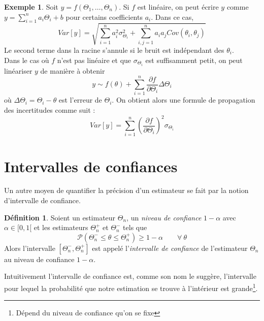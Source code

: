 \documentclass[a4paper,12pt]{report}
\theoremstyle{definition}
\renewcommand{\(}{\left(}
\renewcommand{\)}{\right)}
\renewcommand{\P}{\mathcal{P}}
\renewcommand{\d}{\textit}
\newtheorem{defn}[thm]{Définition}
\newtheorem{exmp}[thm]{Exemple}
\begin{document}
        \begin{exmp}
            Soit $y=f(\Theta_1,\dots,\Theta_n)$. Si $f$ est linéaire, on peut écrire $y$ comme $y=\sum_{i=1}^n a_i\Theta_i+b$ pour certains coefficients $a_i$. Dans ce cas,
            $$Var[y] = \sqrt{\sum_{i=1}^n a_i^2\sigma_{\Theta_i}^2+\sum_{i,j=1}^n a_ia_j Cov(\theta_i,\theta_j)}$$
            Le second terme dans la racine s'annule si le bruit est indépendant des $\theta_i$. \\
            Dans le cas où $f$ n'est pas linéaire et que $\sigma_{\Theta_i}$ est suffisamment petit, on peut linéariser $y$ de manière à obtenir
            $$y\sim f(\theta) + \sum_{i=1}^n\frac{\partial f}{\partial \Theta_i} \Delta \Theta_i$$
            où $\Delta\Theta_i = \Theta_i-\theta$ est l'erreur de $\Theta_i$. On obtient alors une formule de propagation des incertitudes comme suit :
            $$Var[y] = \sum_{i=1}^n\left( \frac{\partial f}{\partial\Theta_i} \right)^2\sigma_{\Theta_i}$$
        \end{exmp}
    
    \section{Intervalles de confiances}
    
        Un autre moyen de quantifier la précision d'un estimateur se fait par la notion d'intervalle de confiance.
        
        \begin{leftbar}
        \begin{defn}
        Soient un estimateur $\Theta_n$, un \d{niveau de confiance} $1-\alpha$ avec $\alpha \in [0,1[$ et les estimateurs $\Theta_n^{+}$ et $\Theta_n^{-}$ tels que 
        $$\P(\Theta_n^{-}\leq \theta \leq \Theta_n^{+}) \geq 1-\alpha\qquad \forall~\theta$$
        Alors l'intervalle $[\Theta_n^{-},\Theta_n^{+}]$ est appelé l'\d{intervalle de confiance} de l'estimateur $\Theta_n$ au niveau de confiance $1-\alpha$.
        \end{defn}
        \end{leftbar}
        
        Intuitivement l'intervalle de confiance est, comme son nom le suggère, l'intervalle pour lequel la probabilité que notre estimation se trouve à l'intérieur est grande\footnote{Dépend du niveau de confiance qu'on se fixe}.
        
\end{document}
